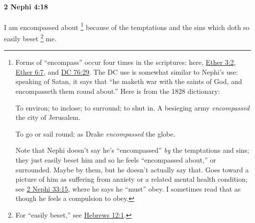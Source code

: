 		\paragraph{2 Nephi 4:18} %
			\label{2NEPHI-4-18}

			I am encompassed about%
				\footnote{%
					\label{2NEPHI-4-18-encompassed}%
					Forms of ``encompass'' occur four times in the scriptures: here, \hyperref[ETHER-3-2]{Ether 3:2}, \hyperref[ETHER-6-7]{Ether 6:7}, and \hyperref[DC76-29]{DC 76:29}. The DC use is somewhat similar to Nephi's use: speaking of Satan, it says that ``he maketh war with the saints of God, and encompasseth them round about.'' Here is from the 1828 dictionary:
						\begin{compactitem}
							\item[1] To environ; to inclose; to surround; to shut in. A besieging army \textit{encompassed} the city of Jerusalem.
							\item[2] To go or sail round; as Drake \textit{encompassed} the globe.
						\end{compactitem}
					Note that Nephi doesn't say he's ``encompassed'' \textit{by} the temptations and sins; they just easily beset him and so he feels ``encompassed about,'' or surrounded. Maybe by them, but he doesn't actually say that. Goes toward a picture of him as suffering from anxiety or a related mental health condition; see \hyperref[2NEPHI-33-15]{2 Nephi 33:15}, where he says he ``must'' obey. I sometimes read that as though he feels a compulsion to obey.
					}
			because of the temptations and the sins which doth so easily beset%
				\footnote{%
					\label{2NEPHI-4-18-easily}%
					For ``easily beset,'' see \hyperref[HEBREWS-12-1]{Hebrews 12:1}.
					}
			me.%
